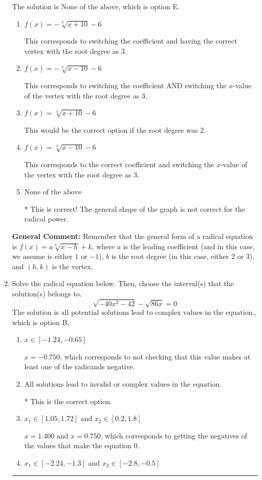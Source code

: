 \documentclass{extbook}[14pt]
\newcommand{\litem}[1]{\item #1

\rule{\textwidth}{0.4pt}}
\begin{document}
\begin{enumerate}
{The solution is \( \text{None of the above} \), which is option E.\begin{enumerate}[label=\Alph*.]
\item \( f(x) = - \sqrt[3]{x + 10} - 6 \)

This corresponds to switching the coefficient and having the correct vertex with the root degree as $3$.
\item \( f(x) = - \sqrt[3]{x - 10} - 6 \)

This corresponds to switching the coefficient AND switching the $x$-value of the vertex with the root degree as $3$.
\item \( f(x) = \sqrt[3]{x + 10} - 6 \)

This would be the correct option if the root degree was $2$.
\item \( f(x) = \sqrt[3]{x - 10} - 6 \)

This corresponds to the correct coefficient and switching the $x$-value of the vertex with the root degree as $3$.
\item \( \text{None of the above} \)

* This is correct! The general shape of the graph is not correct for the radical power.
\end{enumerate}

\textbf{General Comment:} Remember that the general form of a radical equation is $ f(x) = a \sqrt[b]{x - h} + k$, where $a$ is the leading coefficient (and in this case, we assume is either $1$ or $-1$), $b$ is the root degree (in this case, either $2$ or $3$), and $(h, k)$ is the vertex.
}
\litem{
Solve the radical equation below. Then, choose the interval(s) that the solution(s) belongs to.
\[ \sqrt{-40 x^2 - 42} - \sqrt{86 x} = 0 \]The solution is \( \text{all potential solutions lead to complex values in the equation.} \), which is option B.\begin{enumerate}[label=\Alph*.]
\item \( x \in [-1.24,-0.65] \)

$x = -0.750$, which corresponds to not checking that this value makes at least one of the radicands negative.
\item \( \text{All solutions lead to invalid or complex values in the equation.} \)

* This is the correct option.
\item \( x_1 \in [1.05, 1.72] \text{ and } x_2 \in [0.2,1.8] \)

$x = 1.400 \text{ and } x = 0.750$, which corresponds to getting the negatives of the values that make the equation 0.
\item \( x_1 \in [-2.24, -1.3] \text{ and } x_2 \in [-2.8,-0.5] \)


\end{enumerate}}
\end{enumerate}
\end{document}
